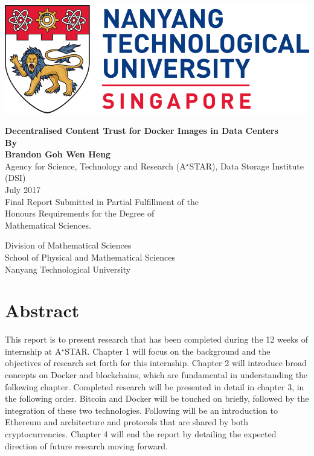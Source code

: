 \documentclass[a4paper,12pt]{article}
\begin{document}
	\begin{titlepage}
		\begin{center}
			\includegraphics[width = \textwidth]{logo_ntu_new.png}
			\vspace*{3cm}
			
			\Large
			\textbf{Decentralised Content Trust for Docker Images in Data Centers}\\		
			\vspace{1.2cm}
			\textbf{By\\ Brandon Goh Wen Heng}\\
			 Agency for Science, Technology and Research (A$^\star$STAR), Data Storage Institute (DSI)\\\vspace{1.2cm}July 2017\\\vspace{1.2cm}
			Final Report Submitted in Partial Fulfillment of the \\Honours Requirements for the Degree of\\Mathematical Sciences.
		
			\vspace{1.2cm}
			Division of Mathematical Sciences\\
			School of Physical and Mathematical Sciences\\
			Nanyang Technological University\\
			\vfill
		\end{center}
	\end{titlepage}


	\tableofcontents
	\newpage
{}
{}
\section*{Abstract}
{\par \noindent This report is to present research that has been completed during the 12 weeks of internship at A$^\star$STAR. Chapter 1 will focus on the background and the objectives of research set forth for this internship. Chapter 2 will introduce broad concepts on Docker and blockchains, which are fundamental in understanding the following chapter. Completed research will be presented in detail in chapter 3, in the following order. Bitcoin and Docker will be touched on briefly, followed by the integration of these two technologies. Following will be an introduction to Ethereum and architecture and protocols that are shared by both cryptocurrencies. Chapter 4 will end the report by detailing the expected direction of future research moving forward.}
\newpage
\end{document}
